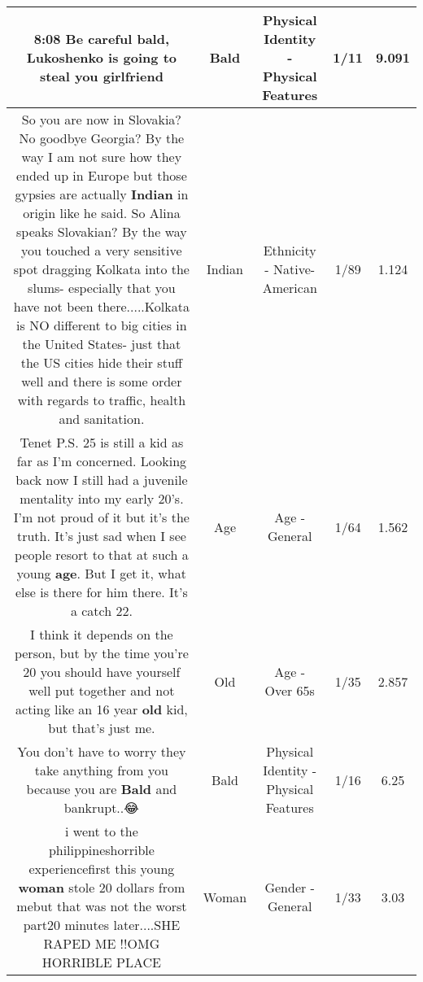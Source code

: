\documentclass[11pt]{article}
\newlength\mylength
\begin{document}
\begin{center}
\begin{longtable}{|C{.65\mylength}|C{.30\mylength}|C{.12\mylength}|C{.12\mylength}|C{.12\mylength}|}
  \small 8:08 Be careful \textbf{bald}, Lukoshenko is going to steal you girlfriend\normalsize   & Bald & Physical Identity - Physical Features & 1/11 & 9.091 \\  \hline
  \small So you are now in Slovakia? No goodbye Georgia? By the way I am not sure how they ended up in Europe but those gypsies are actually \textbf{Indian} in origin like he said. So Alina speaks Slovakian? By the way you touched a very sensitive spot dragging Kolkata into the slums- especially that you have not been there.....Kolkata is NO different to big cities in the United States- just that the US cities hide their stuff well and there is some order with regards to traffic, health and sanitation.\normalsize   & Indian & Ethnicity - Native-American & 1/89 & 1.124 \\  \hline
  \small Tenet P.S. 25 is still a kid as far as I'm concerned. Looking back now I still had a juvenile mentality into my early 20's. I'm not proud of it but it's the truth. It's just sad when I see people resort to that at such a young \textbf{age}. But I get it, what else is there for him there. It's a catch 22.\normalsize   & Age & Age - General & 1/64 & 1.562 \\  \hline
  \small {} I think it depends on the person, but by the time you're 20 you should have yourself well put together and not acting like an 16 year \textbf{old} kid, but that's just me.\normalsize   & Old & Age - Over 65s & 1/35 & 2.857 \\  \hline
  \small You don't have to worry they take anything from you because you are \textbf{Bald} and bankrupt..😂\normalsize   & Bald & Physical Identity - Physical Features & 1/16 & 6.25 \\  \hline
  \small i went to the philippineshorrible experiencefirst this young \textbf{woman} stole 20 dollars from mebut that was not the worst part20 minutes later....SHE RAPED ME !!OMG HORRIBLE PLACE\normalsize   & Woman & Gender - General & 1/33 & 3.03 \\  \hline

\end{longtable}
\end{center}
\end{document}
